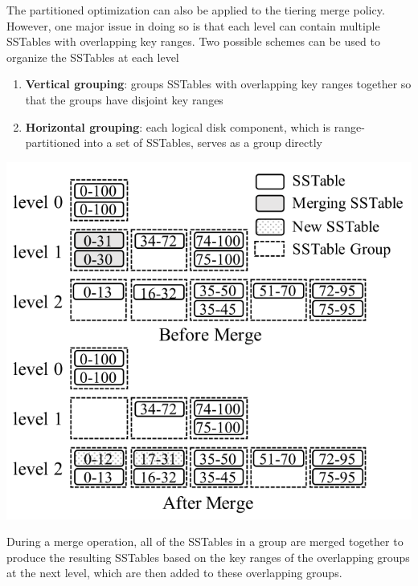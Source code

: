 \documentclass[11pt]{article}
\begin{document}
\begin{enumerate}
The partitioned optimization can also be applied to the tiering merge policy. However, one major issue
in doing so is that each level can contain multiple SSTables with overlapping key ranges. Two possible
schemes can be used to organize the SSTables at each level
\begin{enumerate}
\item \textbf{Vertical grouping}: groups SSTables with overlapping key ranges together so that the groups have
disjoint key ranges
\item \textbf{Horizontal grouping}: each logical disk component, which is range-partitioned into a set of
SSTables, serves as a group directly
\end{enumerate}

\begin{center}
\includegraphics[width=.8\textwidth]{../images/db/6.png}
\end{center}
During a merge operation, all of the SSTables in a group are merged together to produce the resulting
SSTables based on the key ranges of the overlapping groups at the next level, which are then added to
these overlapping groups.


\end{enumerate}
\end{document}
